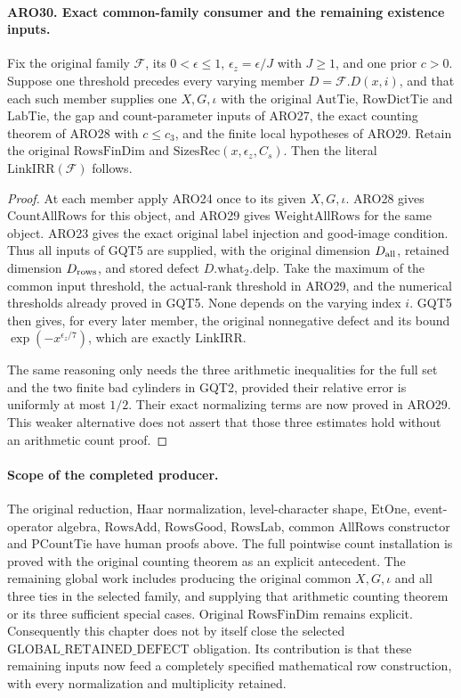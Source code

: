\paragraph{ARO30. Exact common-family consumer and the remaining existence inputs.}
\label{claim:ARO30}
Fix the original family \(\mathcal F\), its \(0<\epsilon\leq1\),
\(\epsilon_z=\epsilon/J\) with \(J\geq1\), and one prior
\(c>0\).  Suppose one threshold precedes every varying member
\(D=\mathcal F.D(x,i)\), and that each such member supplies one
\(X,G,\iota\) with the original \(\mathrm{AutTie}\),
\(\mathrm{RowDictTie}\) and \(\mathrm{LabTie}\), the gap and
count-parameter inputs of ARO27, the exact counting theorem of
ARO28 with \(c\leq c_3\), and the finite local hypotheses of
ARO29.  Retain the original \(\mathrm{RowsFinDim}\) and
\(\mathrm{SizesRec}(x,\epsilon_z,C_s)\).
Then the literal \(\mathrm{LinkIRR}(\mathcal F)\) follows.
\begin{proof}
At each member apply ARO24 once to its given \(X,G,\iota\).
ARO28 gives \(\mathrm{CountAllRows}\) for this object, and ARO29
gives \(\mathrm{WeightAllRows}\) for the same object.  ARO23
gives the exact original label injection and good-image condition.
Thus all inputs of GQT5 are supplied, with the original dimension
\(D_{\rm all}\), retained dimension \(D_{\rm rows}\), and stored
defect \(D.\mathrm{what}_2.\mathrm{delp}\).
Take the maximum of the common input threshold, the actual-rank
threshold in ARO29, and the numerical thresholds already proved
in GQT5.  None depends on the varying index \(i\).  GQT5 then
gives, for every later member, the original nonnegative defect and
its bound \(\exp(-x^{\epsilon_z/7})\), which are exactly
\(\mathrm{LinkIRR}\).

The same reasoning only needs the three arithmetic inequalities
for the full set and the two finite bad cylinders in GQT2,
provided their relative error is uniformly at most \(1/2\).
Their exact normalizing terms are now proved in ARO29.  This
weaker alternative does not assert that those three estimates
hold without an arithmetic count proof.
\end{proof}

\paragraph{Scope of the completed producer.}
The original reduction, Haar normalization, level-character shape,
\(\mathrm{EtOne}\), event-operator algebra, \(\mathrm{RowsAdd}\),
\(\mathrm{RowsGood}\), \(\mathrm{RowsLab}\), common
\(\mathrm{AllRows}\) constructor and \(\mathrm{PCountTie}\) have
human proofs above.  The full pointwise count installation is proved
with the original counting theorem as an explicit antecedent.
The remaining global work includes producing the original common
\(X,G,\iota\) and all three ties in the selected family, and
supplying that arithmetic counting theorem or its three sufficient
special cases.  Original \(\mathrm{RowsFinDim}\) remains explicit.
Consequently this chapter does not by itself close the selected
\(\mathrm{GLOBAL\_RETAINED\_DEFECT}\) obligation.  Its contribution
is that these remaining inputs now feed a completely specified
mathematical row construction, with every normalization and
multiplicity retained.

